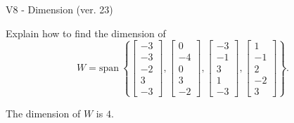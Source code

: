\begin{exercise}
  \begin{exerciseTitle}V8 - Dimension (ver. 23)\end{exerciseTitle}
  \begin{exerciseStatement}
    Explain how to find the dimension of 
\[W=\mathrm{span}\ \left\{\left[\begin{array}{r}
-3 \\
-3 \\
-2 \\
3 \\
-3
\end{array}\right] , \left[\begin{array}{r}
0 \\
-4 \\
0 \\
3 \\
-2
\end{array}\right] , \left[\begin{array}{r}
-3 \\
-1 \\
3 \\
1 \\
-3
\end{array}\right] , \left[\begin{array}{r}
1 \\
-1 \\
2 \\
-2 \\
3
\end{array}\right]\right\}.\]



  \end{exerciseStatement}
  \begin{exerciseAnswer}
   The dimension of \(W\) is  \(4\).
  


  \end{exerciseAnswer}
\end{exercise}